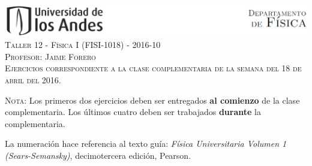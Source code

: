\documentclass[letterpaper,10pt,onecolumn]{article}
\begin{document}
\begin{center}


\includegraphics[width=490pt]{header.png}\\[0.5cm]

\textsc{\LARGE Taller 12 - F\'isica I (FISI-1018) - 2016-10}\\[0.5cm]

\textsc{\Large{Profesor: Jaime Forero}} \\[0.5cm]

\noindent\textsc{Ejercicios correspondiente a la clase complementaria de la semana del 18 de abril del 2016.}\\[0.5cm]
\end{center}

\noindent\textsc{Nota:} 
Los primeros dos ejercicios deben ser
entregados {\bf al comienzo} de la clase complementaria. Los \'ultimos
cuatro deben ser trabajados {\bf durante} la complementaria. 

La numeraci\'on
hace referencia al texto gu\'ia: \textit{F\'isica Universitaria Volumen
  1 (Sears-Semansky)}, decimotercera edici\'on, Pearson.
\end{document}
